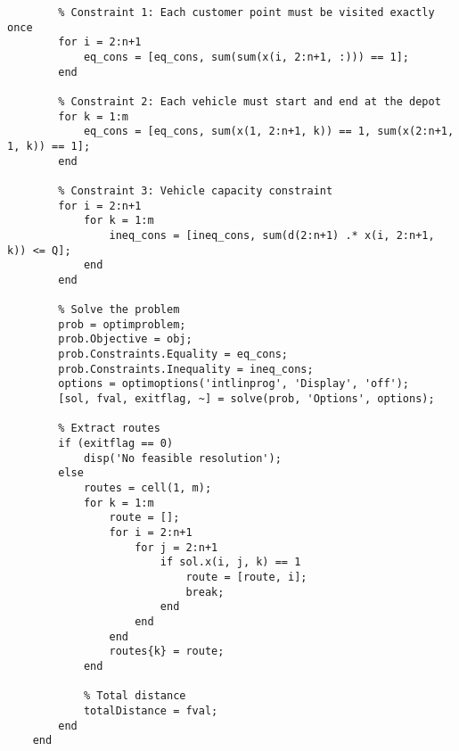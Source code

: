 \begin{lstlisting}
        % Constraint 1: Each customer point must be visited exactly once
        for i = 2:n+1
            eq_cons = [eq_cons, sum(sum(x(i, 2:n+1, :))) == 1];
        end
            
        % Constraint 2: Each vehicle must start and end at the depot
        for k = 1:m
            eq_cons = [eq_cons, sum(x(1, 2:n+1, k)) == 1, sum(x(2:n+1, 1, k)) == 1];
        end
            
        % Constraint 3: Vehicle capacity constraint
        for i = 2:n+1
            for k = 1:m
                ineq_cons = [ineq_cons, sum(d(2:n+1) .* x(i, 2:n+1, k)) <= Q];
            end
        end
        
        % Solve the problem
        prob = optimproblem;
        prob.Objective = obj;
        prob.Constraints.Equality = eq_cons;
        prob.Constraints.Inequality = ineq_cons;
        options = optimoptions('intlinprog', 'Display', 'off');
        [sol, fval, exitflag, ~] = solve(prob, 'Options', options);
            
        % Extract routes
        if (exitflag == 0)
            disp('No feasible resolution');
        else
            routes = cell(1, m);
            for k = 1:m
                route = [];
                for i = 2:n+1
                    for j = 2:n+1
                        if sol.x(i, j, k) == 1
                            route = [route, i];
                            break;
                        end
                    end
                end
                routes{k} = route;
            end
                
            % Total distance
            totalDistance = fval;
        end
    end
    \end{lstlisting}

